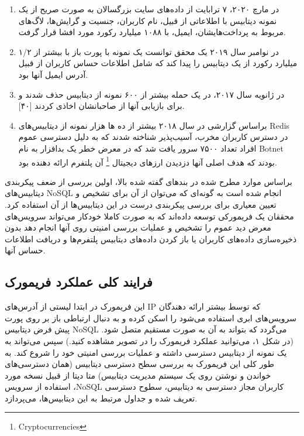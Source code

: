 \documentclass[10pt, a4paper]{article}
\begin{document}
\begin{enumerate}
    \item در مارچ ۲۰۲۰، ۷ ترابایت از داده‌های سایت بزرگسالان به صورت صریح از یک
    نمونه دیتابیس  با اطلاعاتی از قبیل، نام کاربران، جنسیت و
    گرایش‌ها، لاگ‌های مربوط به پرداخت‌هایشان، ایمیل، با ۱۰۸۸ میلیارد رکورد مورد
    افشا قرار گرفت.
    \item در نوامبر سال ۲۰۱۹ یک محقق توانست یک نمونه با پورت باز با بیشتر از ۱/۲
    میلیارد رکورد از یک دیتابیس را پیدا کند که شامل اطلاعات حساس کاربران از قبیل
    آدرس ایمیل آنها بود.
    \item در ژانویه سال ۲۰۱۷، در یک حمله بیشتر از ۶۰۰ نمونه از دیتابیس
     حذف شدند و برای بازیابی آنها از صاحبانشان اخاذی کردند [۴۰].
    \item براساس گزارشی در سال ۲۰۱۸ بیشتر از ده ها هزار نمونه از دیتابیس‌های
    Redis در دسترس کاربران مخرب، آسیب‌پذیر شناخته شدند که به دلیل دسترسی عموم
    افراد تعداد ۷۵۰۰ سرور یافت شد که در معرض خطر یک بدافزار به نام Botnet بودند
    که هدف اصلی آنها دزدیدن ارز‌های دیجیتال \footnote{Cryptocurrencies} آن
    پلتفرم ارائه دهنده بود.
\end{enumerate}

براساس موارد مطرح شده در بند‌های گفته شده بالا، اولین بررسی از ضعف پیکربندی
دیتابیس‌های NoSQL انجام شده است به گونه‌ای که می‌توان از آن برای تشخیص و تعیین
معیاری برای بررسی پیکربندی درست در این دیتابیس‌ها از آن استفاده کرد. محققان یک
فریمورکی توسعه داده‌اند که به صورت کاملا خودکار می‌تواند سرویس‌های معرض دید عموم
را تشخیص و عملیات بررسی امنیتی روی آنها انجام دهد بدون ذخیره‌سازی داده‌های
کاربران یا باز کردن داده‌های دیتابیس پلتفرم‌ها و دریافت اطلاعات حساس آنها.

\subsection{فرایند کلی عملکرد فریمورک} 

این فریمورک در ابتدا لیستی از آدرس‌های IP که توسط بیشتر ارائه دهندگان سرویس‌های
ابری استفاده می‌شود را اسکن کرده و به دنبال ارتباطی باز بر روی پورت پیش فرض
دیتابیس NoSQL می‌گردد که بتواند به آن به صورت مستقیم متصل شود. (در شکل ۱،
می‌توانید عملکرد فریمورک را در تصویر مشاهده کنید.) سپس می‌تواند به یک نمونه از
دیتابیس دسترسی داشته و عملیات بررسی امنیتی خود را شروع کند.  به طور کلی این
فریمورک به بررسی سطح دسترسی دیتابیس (همان دسترسی‌های خواندن و نوشتن روی یک سیستم
مدیریت دیتابیس) متا دیتا از قبیل نسخه مورد استفاده از سرویس ،NoSQL کاربران مجاز
دسترسی به دیتابیس، سطوح دسترسی تعریف شده و جداول مرتبط به این دیتابیس‌ها،
می‌پردازد. 
\end{document}
